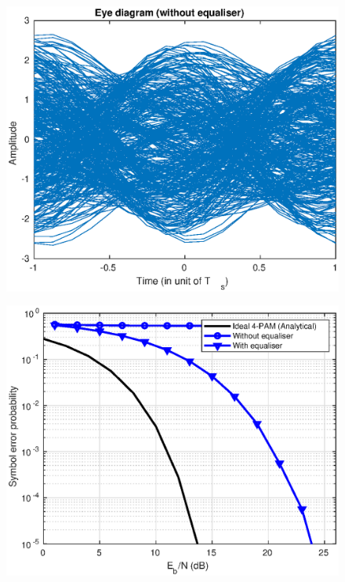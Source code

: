 \begin{figure}
    \begin{center}
        \includegraphics{Equaliser/eye}
    \end{center}
    \caption{}
\end{figure}

\begin{figure}
    \begin{center}
        \includegraphics{Equaliser/ber}
    \end{center}
    \caption{}
\end{figure}

